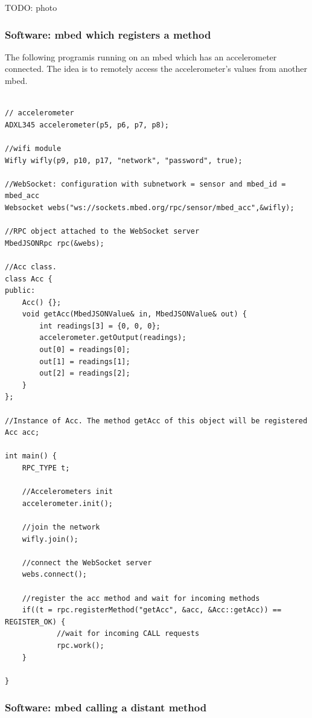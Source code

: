 \documentclass[pdftex,10pt,a4paper]{report}
\begin{document}
TODO: photo

\subsubsection{Software: mbed which registers a method}
The following programis running on an mbed which has an accelerometer connected. The idea is to remotely access the accelerometer's values from another mbed.

\begin{lstlisting}[label=Client which registers a method,caption=Client which registers a method]

// accelerometer
ADXL345 accelerometer(p5, p6, p7, p8);

//wifi module
Wifly wifly(p9, p10, p17, "network", "password", true);

//WebSocket: configuration with subnetwork = sensor and mbed_id = mbed_acc 
Websocket webs("ws://sockets.mbed.org/rpc/sensor/mbed_acc",&wifly);

//RPC object attached to the WebSocket server
MbedJSONRpc rpc(&webs);

//Acc class. 
class Acc {
public:
    Acc() {};
    void getAcc(MbedJSONValue& in, MbedJSONValue& out) {
        int readings[3] = {0, 0, 0};
        accelerometer.getOutput(readings);
        out[0] = readings[0];
        out[1] = readings[1];
        out[2] = readings[2];
    }
};

//Instance of Acc. The method getAcc of this object will be registered
Acc acc;

int main() {
    RPC_TYPE t;
    
    //Accelerometers init
    accelerometer.init();
    
    //join the network
    wifly.join();
    
    //connect the WebSocket server
    webs.connect();

    //register the acc method and wait for incoming methods
    if((t = rpc.registerMethod("getAcc", &acc, &Acc::getAcc)) == REGISTER_OK) {
    		//wait for incoming CALL requests
    		rpc.work(); 
    }
    
}
\end{lstlisting}

\subsubsection{Software: mbed calling a distant method}
\end{document}
